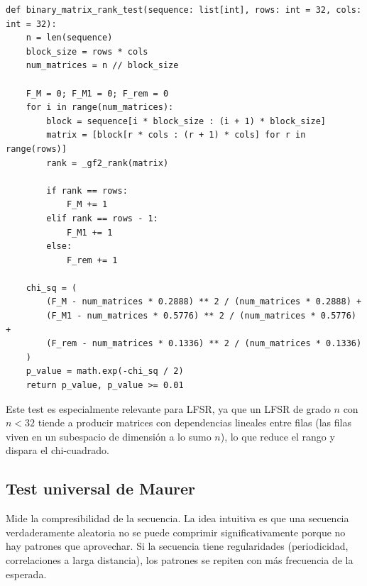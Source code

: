 \begin{lstlisting}[style=Python,caption={Test Binary Matrix Rank (extracto de \texttt{src/tests\_nist/binary\_matrix.py}).}]
def binary_matrix_rank_test(sequence: list[int], rows: int = 32, cols: int = 32):
    n = len(sequence)
    block_size = rows * cols
    num_matrices = n // block_size

    F_M = 0; F_M1 = 0; F_rem = 0
    for i in range(num_matrices):
        block = sequence[i * block_size : (i + 1) * block_size]
        matrix = [block[r * cols : (r + 1) * cols] for r in range(rows)]
        rank = _gf2_rank(matrix)

        if rank == rows:
            F_M += 1
        elif rank == rows - 1:
            F_M1 += 1
        else:
            F_rem += 1

    chi_sq = (
        (F_M - num_matrices * 0.2888) ** 2 / (num_matrices * 0.2888) +
        (F_M1 - num_matrices * 0.5776) ** 2 / (num_matrices * 0.5776) +
        (F_rem - num_matrices * 0.1336) ** 2 / (num_matrices * 0.1336)
    )
    p_value = math.exp(-chi_sq / 2)
    return p_value, p_value >= 0.01
\end{lstlisting}

Este test es especialmente relevante para LFSR, ya que un LFSR de grado $n$ con $n < 32$ tiende a producir matrices con dependencias lineales entre filas
(las filas viven en un subespacio de dimensión a lo sumo $n$), lo que reduce el rango y dispara el chi-cuadrado.

\subsection{Test universal de Maurer}

Mide la compresibilidad de la secuencia. La idea intuitiva es que una secuencia verdaderamente aleatoria no se puede comprimir significativamente porque no hay patrones que aprovechar.
Si la secuencia tiene regularidades (periodicidad, correlaciones a larga distancia), los patrones se repiten con más frecuencia de la esperada.

